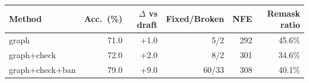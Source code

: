 \begin{tabular}{lrrrrr}
\toprule
Method & Acc.\ (\%) & $\Delta$ vs draft & Fixed/Broken & NFE & Remask ratio \\
\midrule
graph & 71.0 & +1.0 & 5/2 & 292 & 45.6\% \\
graph+check & 72.0 & +2.0 & 8/2 & 301 & 34.6\% \\
graph+check+ban & 79.0 & +9.0 & 60/33 & 308 & 40.1\% \\
\bottomrule
\end{tabular}
